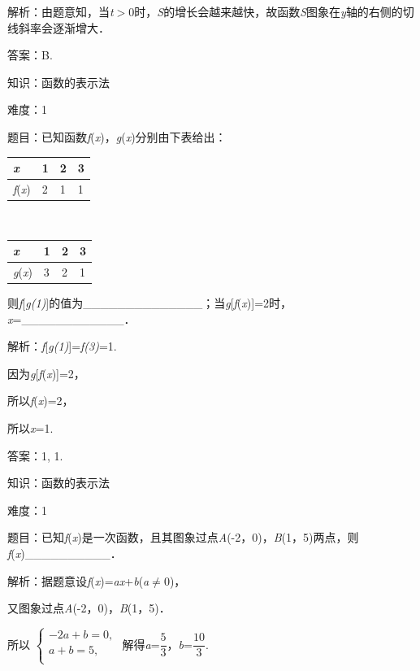 \documentclass{article} %
\begin{document}
解析：由题意知，当\textit{t}$\mathrm{>}$0时，\textit{S}的增长会越来越快，故函数\textit{S}图象在\textit{y}轴的右侧的切线斜率会逐渐增大．

答案：B.

知识：函数的表示法

难度：1

题目：已知函数\textit{f}(\textit{x})，\textit{g}(\textit{x})分别由下表给出：

\begin{tabular}{|p{0.4in}|p{0.2in}|p{0.2in}|p{0.2in}|} \hline
\textit{x} & 1\textit{} & 2\textit{} & 3 \\ \hline
\textit{f}(\textit{x})\textit{} & 2\textit{} & 1\textit{} & 1 \\ \hline
\end{tabular}

　\textit{}

\begin{tabular}{|p{0.4in}|p{0.2in}|p{0.2in}|p{0.2in}|} \hline
\textit{x} & 1\textit{} & 2\textit{} & 3 \\ \hline
\textit{g}(\textit{x})\textit{} & 3\textit{} & 2\textit{} & 1 \\ \hline
\end{tabular}

则\textit{f}[\textit{g(1)}]的值为\_\_\_\_\_\_\_\_\_\_\_\_\_\_；当\textit{g}[\textit{f}(\textit{x})]=2时，\textit{x}=\_\_\_\_\_\_\_\_\_\_\_\_．

解析：\textit{f}[\textit{g(1)}]=\textit{f(3)}=1.

因为\textit{g}[\textit{f}(\textit{x})]=2，

所以\textit{f}(\textit{x})=2，

所以\textit{x}=1.

答案：1, 1.

知识：函数的表示法

难度：1

题目：已知\textit{f}(\textit{x})是一次函数，且其图象过点\textit{A}(-2，0)，\textit{B}(1，5)两点，则\textit{f}(\textit{x})\_\_\_\_\_\_\_\_\_\_．

解析：据题意设\textit{f}(\textit{x})=\textit{ax}+\textit{b}(\textit{a}$\mathrm{\neq}$0)，

又图象过点\textit{A}(-2，0)，\textit{B}(1，5)．

所以
$\left\{
\begin{array}{l}
-2a+b=0,\\
a+b=5,\\
\end{array}
\right.$
解得\textit{a}=$\dfrac{5}{3}$，\textit{b}=$\dfrac{10}{3}$.
\end{document}
